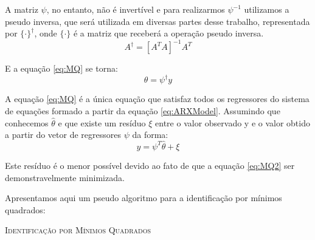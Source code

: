 A matriz $\psi$, no entanto, não é invertível e para realizarmos $\psi^{-1}$ utilizamos a pseudo inversa, que será utilizada em diversas partes desse trabalho, representada por $\{ \cdot\}^\dagger$, onde $\{\cdot\}$ é a matriz que receberá a operação pseudo inversa.
\begin{equation}
A^\dagger=[A^TA]^{-1}A^T
\end{equation}

E a equação \eqref{eq:MQ} se torna:
\begin{equation}\label{eq:MQ2}
\theta=\psi^\dagger y
\end{equation}


A equação \eqref{eq:MQ} é a única equação que satisfaz todos os regressores do sistema de equações formado a partir da equação \eqref{eq:ARXModel}. Assumindo que conhecemos $\hat{\theta}$ e que existe um resíduo $\xi$ entre o valor observado y e o valor obtido a partir do vetor de regressores $\psi$ da forma:
\begin{equation}\label{eq:eMQxi}
y=\psi^T\hat{\theta}+\xi
\end{equation} 

Este resíduo é o menor possível devido ao fato de que a equação \eqref{eq:MQ2} ser demonstravelmente minimizada.


Apresentamos aqui um pseudo algoritmo para a identificação por mínimos quadrados:

\IncMargin{1em}
\begin{algorithm}[H]

	\Retorna{$\theta$}
	\label{alg:mq}
	\caption{\textsc{Identificação por Mínimos Quadrados}}
\end{algorithm}
\DecMargin{1em}


